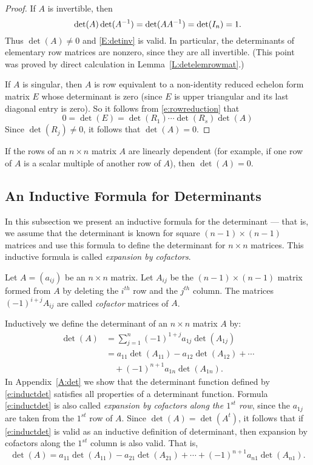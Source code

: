 \documentclass{ximera}
\begin{document}
\begin{proof}  If $A$ is invertible, then 
\[
\det(A)\det(A^{-1}) = \det(AA^{-1}) = \det(I_n) =1.
\]
Thus $\det(A)\neq 0$ and \eqref{E:detinv} is valid. In particular, the 
determinants of elementary row matrices are nonzero, since they are all
invertible. (This point was proved by direct calculation in
Lemma~\ref{L:detelemrowmat}.)
 
If $A$ is singular, then $A$ is row equivalent to a non-identity
reduced echelon form matrix $E$ whose determinant is zero (since
$E$ is upper triangular and its last diagonal entry is zero).
So it follows from
\eqref{e:rowreduction} that 
\[
0=\det(E) = \det(R_1)\cdots\det(R_s)\det(A)
\]
Since $\det(R_j)\neq 0$, it follows that $\det(A)=0$.  \end{proof}

\begin{corollary}
If the rows of an $n\times n$ matrix $A$ are linearly dependent (for example,
if one row of $A$ is a scalar multiple of another row of $A$), then 
$\det(A)=0$.
\end{corollary}


\subsection*{An Inductive Formula for Determinants} 
 
In this subsection we present an inductive formula for the
determinant --- that is, we assume that the determinant is known
for square $(n-1)\times(n-1)$ matrices and use this formula to
define the determinant for $n\times n$ matrices.  This inductive formula
is called {\em expansion by cofactors\/}.
 
Let $A=(a_{ij})$ be an $n\times n$ matrix.  Let $A_{ij}$ be the
$(n-1)\times(n-1)$ matrix formed from $A$ by deleting the
$i^{th}$ row and the $j^{th}$ column.  The matrices $(-1)^{i+j}A_{ij}$ are
called {\em cofactor\/}  matrices of $A$.  

Inductively we define the determinant of an $n\times n$ matrix $A$ by:
\begin{align}
\det(A) & = \sum^n_{j=1} (-1)^{1+j}a_{1j}\det(A_{1j}) \nonumber
\\  & = 
      a_{11}\det(A_{11})-a_{12}\det(A_{12})+\cdots \nonumber\\
  & \quad +(-1)^{n+1}a_{1n}\det(A_{1n}).
    \label{e:inductdet}
\end{align} 
In Appendix~\ref{A:det} we show that the determinant function defined by 
\eqref{e:inductdet} satisfies all properties of a determinant function.
Formula \eqref{e:inductdet} is also called {\em expansion by cofactors along 
the $1^{st}$ row\/}, since the $a_{1j}$ are taken from the $1^{st}$ row 
of $A$.  Since $\det(A)=\det(A^t)$, it follows that if \eqref{e:inductdet} is 
valid as an inductive definition of determinant, then expansion by cofactors 
along the $1^{st}$ column is also valid.  That is,
\begin{equation}  \label{e:inductdetc}
\det(A) = 
a_{11}\det(A_{11})-a_{21}\det(A_{21})+\cdots+(-1)^{n+1}a_{n1}\det(A_{n1}).
\end{equation} 
\end{document}
